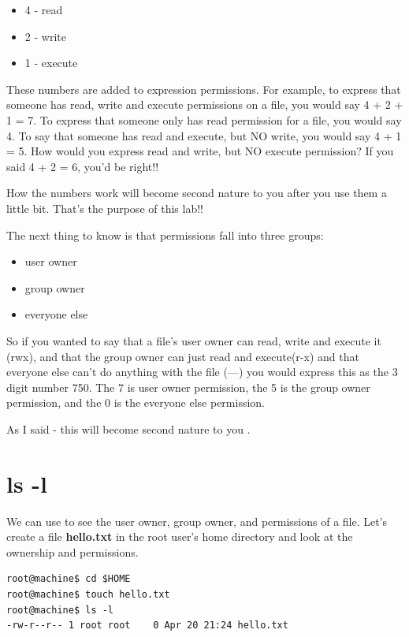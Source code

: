 \documentclass[12pt,a4]{article}
\begin{document}
\begin{itemize}
\item 4 - read
\item 2 - write
\item 1 - execute
\end{itemize}

These numbers are added to expression permissions. For example, to express that someone has read, write and execute permissions on a file, you would say 4 + 2 + 1 = 7.
To express that someone only has read permission for a file, you would say 4. To say that someone has read and execute, but NO write, you would say 4 + 1 = 5. How would you express read and write, but NO execute permission? If you said 4 + 2 = 6, you'd be right!!

How the numbers work will become second nature to you after you use them a little bit. That's the purpose of this lab!!

The next thing to know is that permissions fall into three groups:

\begin{itemize}
\item user owner
\item group owner
\item everyone else
\end{itemize}

So if you wanted to say that a file's user owner can read, write and execute it (rwx), and that the group owner can just read and execute(r-x) and that everyone else can't do anything with the file (---) you would express this as the 3 digit number 750. The 7 is user owner permission, the 5 is the group owner permission, and the 0 is the everyone else permission.

As I said  - this will become second nature to you .

\section{ls -l}
We can use   to see the user owner, group owner, and permissions of a file.
Let's create a file \textbf{hello.txt} in the root user's home directory and look at the ownership and permissions.
\begin{lstlisting}[style=Term, label=listing:awk, caption={Use ls -l to see user owner, group owner and permissions.}]
root@machine$ cd $HOME
root@machine$ touch hello.txt
root@machine$ ls -l
-rw-r--r-- 1 root root    0 Apr 20 21:24 hello.txt
\end{lstlisting}
\end{document}

